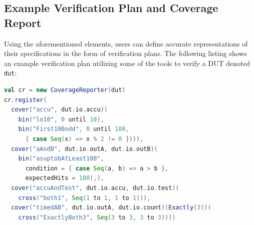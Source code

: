 \documentclass[a4paper]{IEEEtran}
\begin{document}
\subsection{Example Verification Plan and Coverage Report}%
Using the aforementioned elements, users can define accurate representations of their specifications in the form of verification plans. The following listing shows an example verification plan utilizing some of the tools to verify a DUT denoted \texttt{dut}: 
\begin{lstlisting}[language=scala]
val cr = new CoverageReporter(dut)
cr.register(
  cover("accu", dut.io.accu)(
    bin("lo10", 0 until 10),
    bin("First100odd", 0 until 100,
      { case Seq(x) => x % 2 != 0 }))),
  cover("aAndB", dut.io.outA, dut.io.outB)(
    bin("asuptobAtLeast100", 
      condition = { case Seq(a, b) => a > b }, 
      expectedHits = 100),),
  cover("accuAndTest", dut.io.accu, dut.io.test)(
    cross("both1", Seq(1 to 1, 1 to 1))),
  cover("timedAB", dut.io.outA, dut.io.count)(Exactly(3))(
    cross("ExactlyBoth3", Seq(3 to 3, 3 to 3))))
\end{lstlisting}
\end{document}
